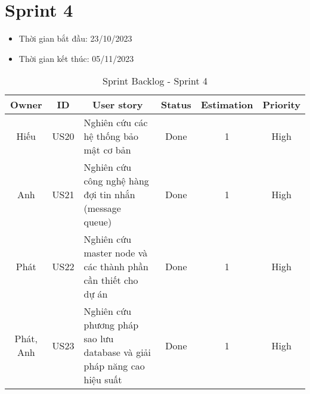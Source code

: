 \section{Sprint 4}
\begin{itemize}
    \item Thời gian bắt đầu: 23/10/2023
    \item Thời gian kết thúc: 05/11/2023
\end{itemize}
\begin{table}[H]
    \begin{tabular}{|c|c|m{6cm}|c|c|c|}
    \hline
    \textbf{Owner} & \textbf{ID} & \multicolumn{1}{c|}{\textbf{User story}}                                & \textbf{Status} & \textbf{Estimation} & \textbf{Priority} \\ \hline
    Hiếu          & US20        & Nghiên cứu các hệ thống bảo mật cơ bản                      & Done            & 1                   & High           \\ \hline
    Anh           & US21        & Nghiên cứu công nghệ hàng đợi tin nhắn (message queue)                       & Done            & 1                   & High           \\ \hline
    Phát          & US22        & Nghiên cứu master node và các thành phần cần thiết cho dự án                      & Done            & 1                   & High           \\ \hline
    Phát, Anh          & US23        & Nghiên cứu phương pháp sao lưu database và giải pháp năng cao hiệu suất                      & Done            & 1                   & High           \\ \hline
    \end{tabular}
    \caption{Sprint Backlog - Sprint 4}
    \label{tab:sprint-4}
\end{table}
